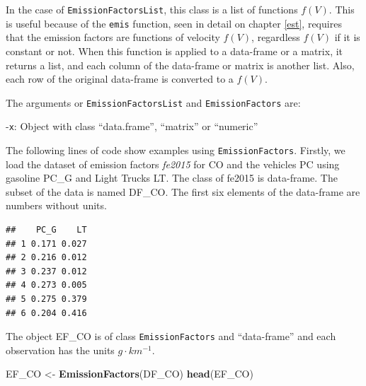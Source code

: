 \documentclass[12pt,graybox,envcountchap,sectrefs]{krantz}
\makeatletter
\newenvironment{Shaded}{\begin{snugshade}}{\end{snugshade}}
\newcommand{\KeywordTok}[1]{\textcolor[rgb]{0.13,0.29,0.53}{\textbf{#1}}}
\newcommand{\StringTok}[1]{\textcolor[rgb]{0.31,0.60,0.02}{#1}}
\newcommand{\CommentTok}[1]{\textcolor[rgb]{0.56,0.35,0.01}{\textit{#1}}}
\newcommand{\OperatorTok}[1]{\textcolor[rgb]{0.81,0.36,0.00}{\textbf{#1}}}
\newcommand{\NormalTok}[1]{#1}
\newenvironment{kframe}{%
\medskip{}
\setlength{\fboxsep}{.8em}
 \def\at@end@of@kframe{}%
 \ifinner\ifhmode%
  \def\at@end@of@kframe{\end{minipage}}%
  \begin{minipage}{\columnwidth}%
 \fi\fi%
 \def\FrameCommand##1{\hskip\@totalleftmargin \hskip-\fboxsep
 \colorbox{shadecolor}{##1}\hskip-\fboxsep
     \hskip-\linewidth \hskip-\@totalleftmargin \hskip\columnwidth}%
 \MakeFramed {\advance\hsize-\width
   \@totalleftmargin\z@ \linewidth\hsize
   \@setminipage}}%
 {\par\unskip\endMakeFramed%
 \at@end@of@kframe}
\renewenvironment{Shaded}{\begin{kframe}}{\end{kframe}}
\theoremstyle{definition}
\theoremstyle{definition}
\theoremstyle{definition}
\theoremstyle{remark}
\makeatother
\begin{document}
In the case of \texttt{EmissionFactorsList}, this class is a list of
functions \(f(V)\). This is useful because of the \texttt{emis}
function, seen in detail on chapter \ref{est}, requires that the
emission factors are functions of velocity \(f(V)\), regardless \(f(V)\)
if it is constant or not. When this function is applied to a data-frame
or a matrix, it returns a list, and each column of the data-frame or
matrix is another list. Also, each row of the original data-frame is
converted to a \(f(V)\).

The arguments or \texttt{EmissionFactorsList} and
\texttt{EmissionFactors} are:

-\texttt{x}: Object with class ``data.frame'', ``matrix'' or ``numeric''

The following lines of code show examples using
\texttt{EmissionFactors}. Firstly, we load the dataset of emission
factors \emph{fe2015} for CO and the vehicles PC using gasoline PC\_G
and Light Trucks LT. The class of fe2015 is data-frame. The subset of
the data is named DF\_CO. The first six elements of the data-frame are
numbers without units.

\begin{Shaded}
\end{Shaded}

\begin{verbatim}
##    PC_G    LT
## 1 0.171 0.027
## 2 0.216 0.012
## 3 0.237 0.012
## 4 0.273 0.005
## 5 0.275 0.379
## 6 0.204 0.416
\end{verbatim}

The object EF\_CO is of class \texttt{EmissionFactors} and
``data-frame'' and each observation has the units \(g \cdot km^{-1}\).

\begin{Shaded}
\begin{Highlighting}[]
\NormalTok{EF_CO <-}\StringTok{ }\KeywordTok{EmissionFactors}\NormalTok{(DF_CO)}
\KeywordTok{head}\NormalTok{(EF_CO)}
\end{Highlighting}
\end{Shaded}
\end{document}
